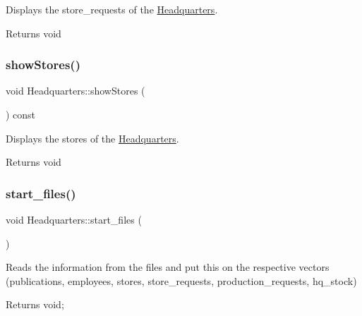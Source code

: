 Displays the store\+\_\+requests of the \hyperlink{class_headquarters}{Headquarters}. 

\begin{DoxyReturn}{Returns}
void 
\end{DoxyReturn}
\mbox{\label{class_headquarters_a5bd547ce60d0ebf56fa578686f88d207}} 
\subsubsection{\texorpdfstring{show\+Stores()}{showStores()}}
{\footnotesize\ttfamily void Headquarters\+::show\+Stores (\begin{DoxyParamCaption}{ }\end{DoxyParamCaption}) const}



Displays the stores of the \hyperlink{class_headquarters}{Headquarters}. 

\begin{DoxyReturn}{Returns}
void 
\end{DoxyReturn}
\mbox{\label{class_headquarters_a55cc9c6aa484bb13d2612baa90098183}} 
\subsubsection{\texorpdfstring{start\+\_\+files()}{start\_files()}}
{\footnotesize\ttfamily void Headquarters\+::start\+\_\+files (\begin{DoxyParamCaption}{ }\end{DoxyParamCaption})}



Reads the information from the files and put this on the respective vectors (publications, employees, stores, store\+\_\+requests, production\+\_\+requests, hq\+\_\+stock) 

\begin{DoxyReturn}{Returns}
void; 
\end{DoxyReturn}
\mbox{\label{class_headquarters_a33d7a21771cada0e0af7135c36f6a19d}} 
